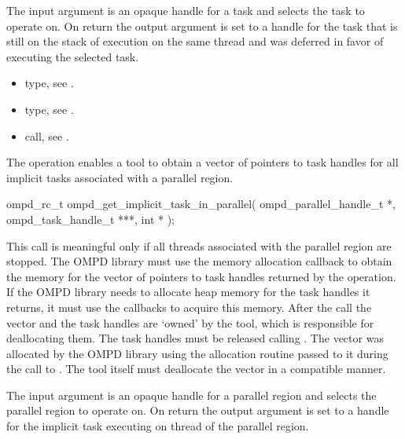 \argdesc
The input argument  is an opaque handle for a task and selects the task to operate on.
On return the output argument  is set to a handle for the task that is
still on the stack of execution on the same thread and was deferred in favor of executing the selected task.

\crossreferences
\begin{itemize}
  \item {} type, see .
	\item {} type, see .
	\item {} call, see .
\end{itemize}

\label{subsubsubsec:ompd_get_implicit_task_in_parallel}
\summary
The   operation enables a tool to obtain a
vector of pointers to task handles for all implicit tasks associated with a parallel region.

\format

\begin{cspecific}
\begin{ompSyntax}
ompd_rc_t ompd_get_implicit_task_in_parallel(
  ompd_parallel_handle_t *,
  ompd_task_handle_t ***,
  int *
);
\end{ompSyntax}
\end{cspecific}


\descr
This call is meaningful only if all threads associated with the parallel region are stopped.
The OMPD library must use the memory allocation callback to obtain the memory for the vector of
pointers to task handles returned by the operation. If the OMPD library needs to allocate
heap memory for the task handles it returns, it must use the callbacks to acquire this memory.
After the call the vector and the task handles are `owned' by the tool, which is responsible for
deallocating them. The task handles must be released calling .
The vector was allocated by the OMPD library using the
allocation routine passed to it during the call to .
The tool itself must deallocate the vector in a compatible manner.

\argdesc
The input argument  is an opaque handle for a parallel region and selects the parallel region to operate on.
On return the output argument  is set to a handle for the implicit task
executing on  thread of the parallel region.

